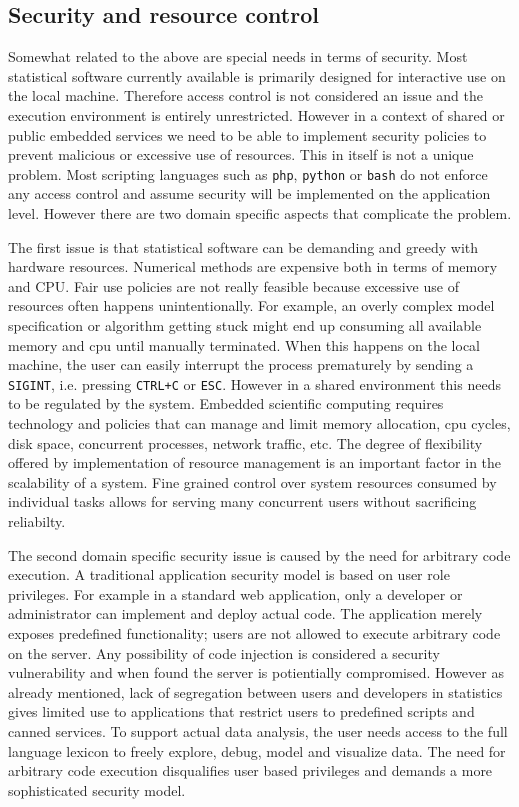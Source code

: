 \subsection{Security and resource control}

Somewhat related to the above are special needs in terms of security. Most statistical software currently available is primarily designed for interactive use on the local machine. Therefore access control is not considered an issue and the execution environment is entirely unrestricted. However in a context of shared or public embedded services we need to be able to implement security policies to prevent malicious or excessive use of resources. This in itself is not a unique problem. Most scripting languages such as \texttt{php}, \texttt{python} or \texttt{bash} do not enforce any access control and assume security will be implemented on the application level. However there are two domain specific aspects that complicate the problem. 

The first issue is that statistical software can be demanding and greedy with hardware resources. Numerical methods are expensive both in terms of memory and CPU. Fair use policies are not really feasible because excessive use of resources often happens unintentionally. For example, an overly complex model specification or algorithm getting stuck might end up consuming all available memory and cpu until manually terminated. When this happens on the local machine, the user can easily interrupt the process prematurely by sending a \texttt{SIGINT}, i.e. pressing \texttt{CTRL+C} or \texttt{ESC}. However in a shared environment this needs to be regulated by the system. Embedded scientific computing requires technology and policies that can manage and limit memory allocation, cpu cycles, disk space, concurrent processes, network traffic, etc. The degree of flexibility offered by implementation of resource management is an important factor in the scalability of a system. Fine grained control over system resources consumed by individual tasks allows for serving many concurrent users without sacrificing reliabilty. 

The second domain specific security issue is caused by the need for arbitrary code execution. A traditional application security model is based on user role privileges. For example in a standard web application, only a developer or administrator can implement and deploy actual code. The application merely exposes predefined functionality; users are not allowed to execute arbitrary code on the server. Any possibility of code injection is considered a security vulnerability and when found the server is potientially compromised. However as already mentioned, lack of segregation between users and developers in statistics gives limited use to applications that restrict users to predefined scripts and canned services. To support actual data analysis, the user needs access to the full language lexicon to freely explore, debug, model and visualize data. The need for arbitrary code execution disqualifies user based privileges and demands a more sophisticated security model.



